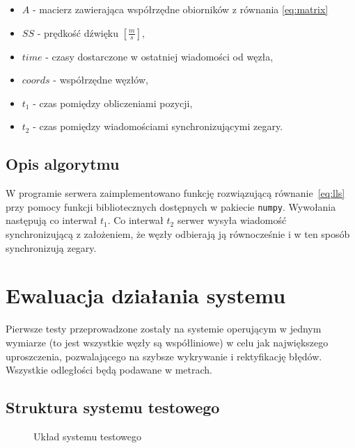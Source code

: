 \begin{itemize}
    \item $A$ - macierz zawierająca współrzędne obiorników z równania \ref{eq:matrix}
    \item $SS$ {-} prędkość dźwięku $\left[\frac{m}{s}\right]$,
    \item $time$ {-} czasy dostarczone w ostatniej wiadomości od węzła,
    \item $coords$ {-} współrzędne węzłów,
    \item $t_1$ {-} czas pomiędzy obliczeniami pozycji,
    \item $t_2$ {-} czas pomiędzy wiadomościami synchronizującymi zegary.
\end{itemize}

\subsection{Opis algorytmu}

W programie serwera zaimplementowano funkcję rozwiązującą równanie~\ref{eq:lls} przy pomocy funkcji bibliotecznych dostępnych w pakiecie \texttt{numpy}. Wywołania następują co interwał $t_1$. Co interwał $t_2$ serwer wysyła wiadomość synchronizującą z założeniem, że węzły odbierają ją równocześnie i w ten sposób synchronizują zegary.

\section{Ewaluacja działania systemu}

Pierwsze testy przeprowadzone zostały na systemie operującym w jednym wymiarze (to jest wszystkie węzły są współliniowe) w celu jak największego uproszczenia, pozwalającego na szybsze wykrywanie i rektyfikację błędów. Wszystkie odległości będą podawane w metrach.

\subsection{Struktura systemu testowego}

\begin{figure}[h]
    \centering
    \caption{Układ systemu testowego}
\label{fig:test_setup}
\end{figure}

